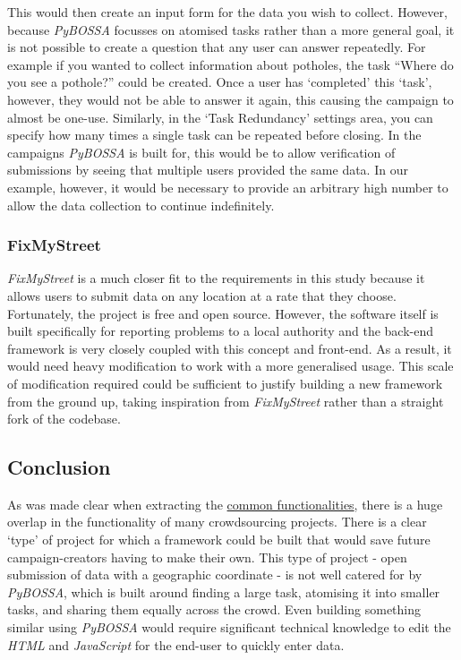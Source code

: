\documentclass{article}
\begin{document}
		This would then create an input form for the data you wish to collect. However, because \emph{PyBOSSA} focusses on atomised tasks rather than a more general goal, it is not possible to create a question that any user can answer repeatedly. For example if you wanted to collect information about potholes, the task ``Where do you see a pothole?'' could be created. Once a user has `completed' this `task', however, they would not be able to answer it again, this causing the campaign to almost be one-use. Similarly, in the `Task Redundancy' settings area, you can specify how many times a single task can be repeated before closing. In the campaigns \emph{PyBOSSA} is built for, this would be to allow verification of submissions by seeing that multiple users provided the same data. In our example, however, it would be necessary to provide an arbitrary high number to allow the data collection to continue indefinitely.

		\subsubsection{FixMyStreet}

		\emph{FixMyStreet} is a much closer fit to the requirements in this study because it allows users to submit data on any location at a rate that they choose. Fortunately, the project is free\cite{_mysociety/fixmystreet_2015} and open source. However, the software itself is built specifically for reporting problems to a local authority and the back-end framework is very closely coupled with this concept and front-end. As a result, it would need heavy modification to work with a more generalised usage. This scale of modification required could be sufficient to justify building a new framework from the ground up, taking inspiration from \emph{FixMyStreet} rather than a straight fork of the codebase.

		\subsection{Conclusion}

		As was made clear when extracting the \hyperref[sec:common-functionalities]{common functionalities}, there is a huge overlap in the functionality of many crowdsourcing projects. There is a clear `type' of project for which a framework could be built that would save future campaign-creators having to make their own. This type of project - open submission of data with a geographic coordinate - is not well catered for by \emph{PyBOSSA}, which is built around finding a large task, atomising it into smaller tasks, and sharing them equally across the crowd. Even building something similar using \emph{PyBOSSA} would require significant technical knowledge to edit the \emph{HTML} and \emph{JavaScript} for the end-user to quickly enter data.
\end{document}
